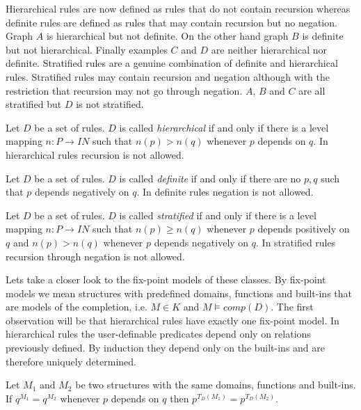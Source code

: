 Hierarchical rules are now defined as rules that do not contain recursion whereas definite rules
are defined as rules that may contain recursion but no negation. Graph $A$ is hierarchical but 
not definite. On the other hand graph $B$ is definite but not hierarchical. Finally examples 
$C$ and $D$ are neither hierarchical nor definite. Stratified rules are a genuine combination of 
definite and hierarchical rules. Stratified rules may contain recursion and negation although with 
the restriction that recursion may not go through negation. $A$, $B$ and $C$ are all stratified but
$D$ is not stratified.

\begin{Def} Let $D$ be a set of rules. $D$ is called {\em hierarchical} if and only if there is a 
level mapping $n:P \rightarrow I\!\!N$ such that $n(p) > n(q)$ whenever $p$ depends on $q$. In
hierarchical rules recursion is not allowed.
\end{Def}

\begin{Def} Let $D$ be a set of rules. $D$ is called {\em definite} if and only if there are no 
$p,q$ such that $p$ depends negatively on $q$. In definite rules negation is not allowed.
\end{Def}

\begin{Def} Let $D$ be a set of rules. $D$ is called {\em stratified} if and only if there is a 
level mapping $n:P \rightarrow I\!\!N$ such that $n(p) \geq n(q)$ whenever $p$ depends positively
on $q$ and $n(p) > n(q)$ whenever $p$ depends negatively on $q$. In stratified rules recursion 
through negation is not allowed.
\end{Def}

Lets take a closer look to the fix-point models of these classes. By fix-point models we mean
structures with predefined domains, functions and built-ins that are models of the completion,
i.e. $M \in K$ and $M \models comp(D)$. The first observation will be that hierarchical rules have 
exactly one fix-point model. In hierarchical rules the user-definable predicates depend only on 
relations previously defined. By induction they depend only on the built-ins and are therefore 
uniquely determined. 

\begin{Lem} 
\label{lemdep}
Let $M_1$ and $M_2$ be two structures with the same domains, functions and built-ins. 
If $q^{M_1} = q^{M_2}$ whenever $p$ depends on $q$ then $p^{T_D(M_1)} = p^{T_D(M_2)}$.
\end{Lem}

